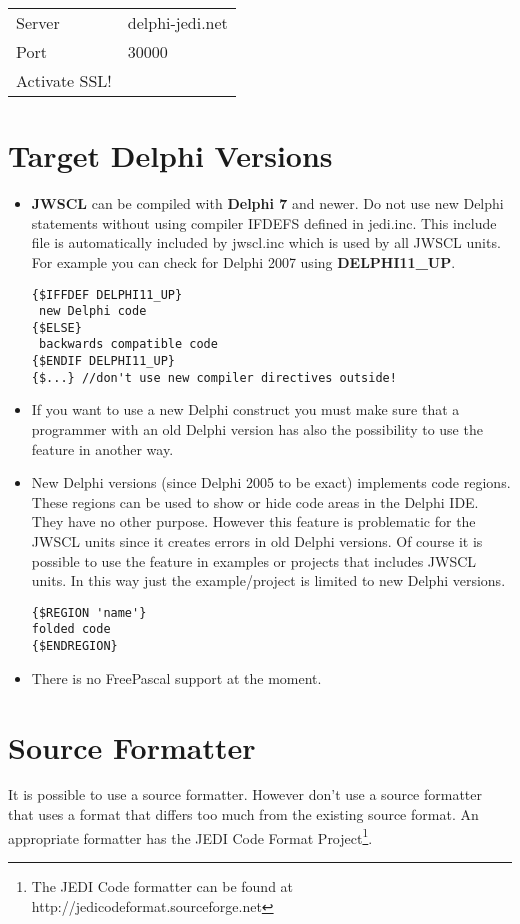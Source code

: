 \documentclass[a4paper,oneside,10pt]{article}
\begin{document}
\begin{tabular}{ll}
Server 	 & delphi-jedi.net\\			
Port	   & 30000\\
Activate SSL!\\
\end{tabular}


\section{Target Delphi Versions}
\begin{itemize}
	\item \textbf{JWSCL} can be compiled with \textbf{Delphi 7} and newer. Do not use new Delphi statements without using compiler IFDEFS defined in jedi.inc. This include file is automatically included by jwscl.inc which is used by all JWSCL units. For example you can check for Delphi 2007 using \textbf{DELPHI11\_UP}.
\begin{lstlisting} 
{$IFFDEF DELPHI11_UP}
 new Delphi code
{$ELSE}
 backwards compatible code
{$ENDIF DELPHI11_UP}
{$...} //don't use new compiler directives outside!
\end{lstlisting}  
\item If you want to use a new Delphi construct you must make sure that a programmer with an old Delphi version has also the possibility to use the feature in another way.
\item New Delphi versions (since Delphi 2005 to be exact) implements code regions. These regions can be used to show or hide code areas in the Delphi IDE. They have no other purpose. However this feature is problematic for the JWSCL units since it creates errors in old Delphi versions. Of course it is possible to use the feature in examples or projects that includes JWSCL units. In this way just the example/project is limited to new Delphi versions.

\begin{lstlisting}
{$REGION 'name'}
folded code    
{$ENDREGION}
\end{lstlisting}

\item There is no FreePascal support at the moment.
\end{itemize}

\section{Source Formatter}
It is possible to use a source formatter. However don't use a source formatter that uses a format that differs too much from the existing source format. An appropriate formatter has the JEDI Code Format Project\footnote{The JEDI Code formatter can be found at http://jedicodeformat.sourceforge.net}.
\end{document}
